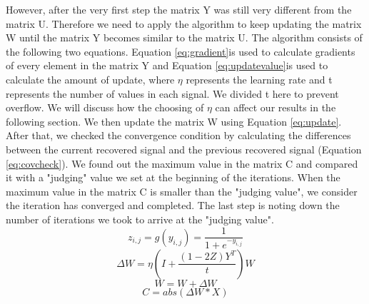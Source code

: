 \documentclass[UTF8,12pt]{article}
\begin{document}
	However, after the very first step the matrix Y was still very different from the matrix U. Therefore we need to apply the algorithm to keep updating the matrix W until the matrix Y becomes similar to the matrix U. The algorithm consists of the following two equations. Equation \ref{eq:gradient}is used to calculate gradients of every element in the matrix Y and Equation \ref{eq:updatevalue}is used to calculate the amount of update, where $\eta$ represents the learning rate and t represents the number of values in each signal. We divided t here to prevent overflow. We will discuss how the choosing of $\eta$ can affect our results in the following section. We then update the matrix W using Equation \ref{eq:update}. After that, we checked the convergence condition by calculating the differences between the current recovered signal and the previous recovered signal (Equation \ref{eq:covcheck}). We found out the maximum value in the matrix C and compared it with a "judging" value we set at the beginning of the iterations. When the maximum value in the matrix C is smaller than the "judging value", we consider the iteration has converged and completed. The last step is noting down the number of iterations we took to arrive at the "judging value".
	\begin{equation}
	\label{eq:gradient}
	z_{i,j} = g(y_{i,j}) = \frac{1}{1+e^{-y_{i,j}}}
	\end{equation}
	\begin{equation}
	\label{eq:updatevalue}
	\Delta W = \eta (I+\frac{(1-2Z)Y^{T}}{t})W
	\end{equation}
	\begin{equation}
	\label{eq:update}
	W = W+\Delta W
	\end{equation}
	\begin{equation}
	\label{eq:covcheck}
	C = abs(\Delta W*X)
	\end{equation}
	
\end{document}
